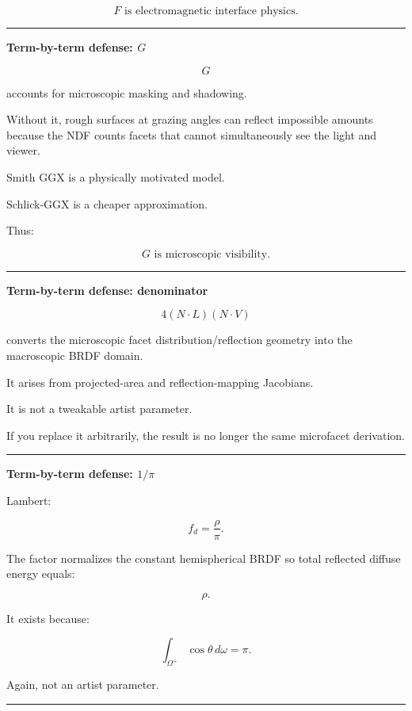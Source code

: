 \[
\boxed{
F\text{ is electromagnetic interface physics.}
}
\]

\begin{center}\rule{0.5\linewidth}{0.5pt}\end{center}

\textbf{Term-by-term defense: \(G\)}

\[
G
\]

accounts for microscopic masking and shadowing.

Without it, rough surfaces at grazing angles can reflect impossible amounts because the NDF counts facets that cannot simultaneously see the light and viewer.

Smith GGX is a physically motivated model.

Schlick-GGX is a cheaper approximation.

Thus:

\[
\boxed{
G\text{ is microscopic visibility.}
}
\]

\begin{center}\rule{0.5\linewidth}{0.5pt}\end{center}

\textbf{Term-by-term defense: denominator}

\[
4(N\cdot L)(N\cdot V)
\]

converts the microscopic facet distribution/reflection geometry into the macroscopic BRDF domain.

It arises from projected-area and reflection-mapping Jacobians.

It is not a tweakable artist parameter.

If you replace it arbitrarily, the result is no longer the same microfacet derivation.

\begin{center}\rule{0.5\linewidth}{0.5pt}\end{center}

\textbf{Term-by-term defense: \(1/\pi\)}

Lambert:

\[
f_d=
\frac{\rho}{\pi}.
\]

The factor normalizes the constant hemispherical BRDF so total reflected diffuse energy equals:

\[
\rho.
\]

It exists because:

\[
\int_{\Omega^+}\cos\theta\,d\omega=\pi.
\]

Again, not an artist parameter.

\begin{center}\rule{0.5\linewidth}{0.5pt}\end{center}

